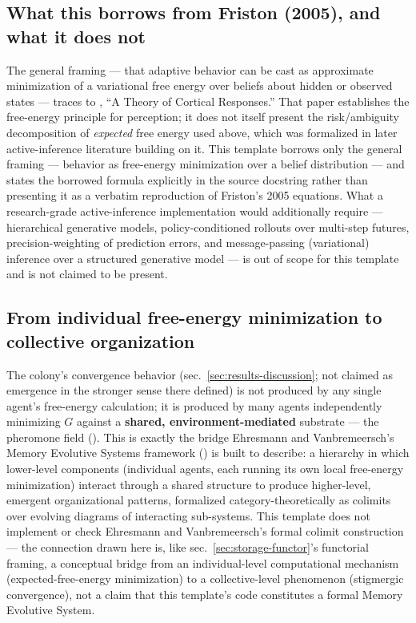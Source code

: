 \documentclass[
  english,
]{article}
\theoremstyle{definition}
\begin{document}
\subsection{What this borrows from Friston (2005), and what it does
not}\label{what-this-borrows-from-friston-2005-and-what-it-does-not}

The general framing --- that adaptive behavior can be cast as
approximate minimization of a variational free energy over beliefs about
hidden or observed states --- traces to \citet{friston2005theory}, ``A
Theory of Cortical Responses.'' That paper establishes the free-energy
principle for perception; it does not itself present the risk/ambiguity
decomposition of \emph{expected} free energy used above, which was
formalized in later active-inference literature building on it. This
template borrows only the general framing --- behavior as free-energy
minimization over a belief distribution --- and states the borrowed
formula explicitly in the source docstring rather than presenting it as
a verbatim reproduction of Friston's 2005 equations. What a
research-grade active-inference implementation would additionally
require --- hierarchical generative models, policy-conditioned rollouts
over multi-step futures, precision-weighting of prediction errors, and
message-passing (variational) inference over a structured generative
model --- is out of scope for this template and is not claimed to be
present.

\subsection{From individual free-energy minimization to collective
organization}\label{from-individual-free-energy-minimization-to-collective-organization}

The colony's convergence behavior (sec.~\ref{sec:results-discussion};
not claimed as emergence in the stronger sense there defined) is not
produced by any single agent's free-energy calculation; it is produced
by many agents independently minimizing \(G\) against a \textbf{shared,
environment-mediated} substrate --- the pheromone field
(). This is exactly the
bridge Ehresmann and Vanbremeersch's Memory Evolutive Systems framework
(\citet{ehresmann2007memory}) is built to describe: a hierarchy in which
lower-level components (individual agents, each running its own local
free-energy minimization) interact through a shared structure to produce
higher-level, emergent organizational patterns, formalized
category-theoretically as colimits over evolving diagrams of interacting
sub-systems. This template does not implement or check Ehresmann and
Vanbremeersch's formal colimit construction --- the connection drawn
here is, like sec.~\ref{sec:storage-functor}'s functorial framing, a
conceptual bridge from an individual-level computational mechanism
(expected-free-energy minimization) to a collective-level phenomenon
(stigmergic convergence), not a claim that this template's code
constitutes a formal Memory Evolutive System.
\end{document}
